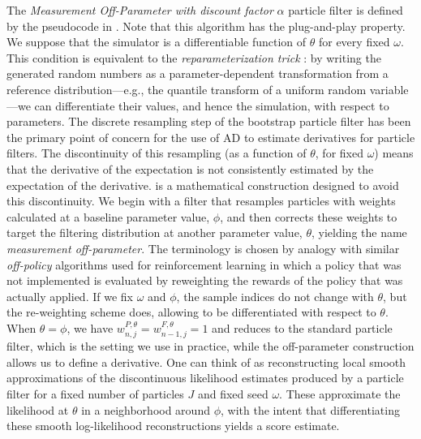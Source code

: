 The {\it Measurement Off-Parameter with discount factor} $\alpha$ particle filter is defined by the pseudocode in .
Note that this algorithm has the plug-and-play property.
We suppose that the simulator is a differentiable function of $\theta$ for every fixed $\omega$.
This condition is equivalent to the {\it reparameterization trick} \citep{corenflos21}: by writing the generated random numbers as a parameter-dependent transformation from a reference distribution---e.g., the quantile transform of a uniform random variable---we can differentiate their values, and hence the simulation, with respect to parameters.
The discrete resampling step of the bootstrap particle filter has been the primary point of concern for the use of AD to estimate derivatives for particle filters.
The discontinuity of this resampling (as a function of $\theta$, for fixed $\omega$) means that the derivative of the expectation is not consistently estimated by the expectation of the derivative. 
 is a mathematical construction designed to avoid this discontinuity.
We begin with a filter that resamples particles with weights calculated at a baseline parameter value, $\phi$, and then corrects these weights to target the filtering distribution at another parameter value, $\theta$, yielding the name {\it measurement off-parameter}.
The terminology is chosen by analogy with similar {\it off-policy} algorithms used for reinforcement learning in which a policy that was not implemented is evaluated by reweighting the rewards of the policy that was actually applied.
If we fix $\omega$ and $\phi$, the sample indices do not change with $\theta$, but the re-weighting scheme does, allowing  to be differentiated with respect to $\theta$.
When $\theta = \phi$, we have $w_{n,j}^{P,\theta} = w_{n-1,j}^{F,\theta} = 1$ and  reduces to the standard particle filter, which is the setting we use in practice, while the off-parameter construction allows us to define a derivative.
One can think of  as reconstructing local smooth approximations of the discontinuous likelihood estimates produced by a particle filter for a fixed number of particles $J$ and fixed seed $\omega$.
These approximate the likelihood at $\theta$ in a neighborhood around $\phi$, with the intent that differentiating these smooth log-likelihood reconstructions yields a score estimate.

